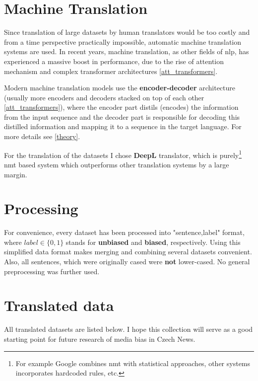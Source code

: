  
 
 
 
\section{Machine Translation}\label{DeepL}
Since translation of large datasets by human translators would be too costly and from a time perspective practically impossible, automatic machine translation systems are used. In recent years, machine translation, as other fields of \Gls{nlp}, has experienced a massive boost in performance, due to the rise of attention mechanism and complex transformer architectures \ref{att_transformers}.

Modern machine translation models use the \textbf{encoder-decoder} architecture (usually more encoders and decoders stacked on top of each other \ref{att_transformers}), where the encoder part distils (encodes) the information from the input sequence and the decoder part is responsible for decoding this distilled information and mapping it to a sequence in the target language. For more details see \ref{theory}.

For the translation of the datasets I chose \textbf{DeepL} translator, which is purely\footnote{For example Google combines \Gls{nmt} with statistical approaches, other systems incorporates hardcoded rules, etc.} \Gls{nmt} based system which outperforms other translation systems by a large margin.






\section{Processing}\label{processing}
For convenience, every dataset has been processed into "sentence,label" format, where $label \in \{0,1\}$ stands for \textbf{unbiased} and \textbf{biased}, respectively. Using this simplified data format makes merging and combining several datasets convenient. Also, all sentences, which were originally cased were \textbf{not} lower-cased. No general preprocessing was further used.

\section{Translated data}
All translated datasets are listed below. I hope this collection will serve as a good starting point for future research of media bias in Czech News.

